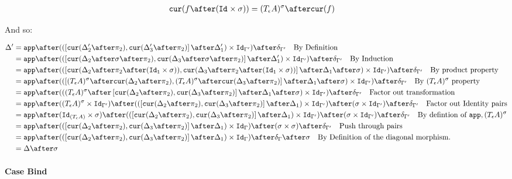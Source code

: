 {    \begin{align}
        \cur{f\after(\Id{}\times \si)} & = (\tea)^{\si} \after\cur{f}
    \end{align}

    And so:

    \begin{align}
        \D' & =\app\after((\fld{\cur{\D_2'\after\pp}}{\cur{\D_3'\after\pp}}\after\D_1')\times \Id{\G'})\after\diag{\G'}\qt{By Definition}\\
        & =\app\after((\fld{\cur{\D_2\after\si\after\pp}}{\cur{\D_3\after\si\after\pp}}\after\D_1')\times \Id{\G'})\after\diag{\G'}\qt{By Induction}\\
        & = \app\after((\fld{\cur{\D_2\after\pp\after(\Id{\1}\times \si)}}{\cur{\D_3\after\pp\after(\Id{\1}\times \si)}}\after\D_1\after\si)\times \Id{\G'})\after\diag{\G'}\qt{By product property}\\
        & = \app\after((\fld{(\tea)^{\si}\after\cur{\D_2\after\pp}}{(\tea)^{\si}\after\cur{\D_3\after\pp}}\after\D_1\after\si)\times \Id{\G'})\after\diag{\G'}\qt{By $(\tea)^{\si}$ property}\\
        & = \app\after(((\tea)^{\si}\after\fld{\cur{\D_2\after\pp}}{\cur{\D_3\after\pp}}\after\D_1\after\si)\times \Id{\G'})\after\diag{\G'}\qt{Factor out transformation}\\
        & = \app\after((\tea)^{\si}\times\Id{\G'})\after((\fld{\cur{\D_2\after\pp}}{\cur{\D_3\after\pp}}\after\D_1)\times \Id{\G'})\after(\si \times \Id{\G'})\after\diag{\G'}\qt{Factor out Identity pairs}\\
        & = \app\after(\Id{(\tea)}\times\si)\after((\fld{\cur{\D_2\after\pp}}{\cur{\D_3\after\pp}}\after\D_1) \times \Id{\G'})\after(\si \times \Id{\G'})\after\diag{\G'}\qt{By defintion of $\app, (\tea)^{\si}$}\\
        & = \app\after((\fld{\cur{\D_2\after\pp}}{\cur{\D_3\after\pp}}\after\D_1)\times \idg)\after(\si \times \si)\after\diag{\G'}\qt{Push through pairs}\\
        & = \app\after((\fld{\cur{\D_2\after\pp}}{\cur{\D_3\after\pp}}\after\D_1)\times \idg)\after\diag{\G}\after\si\qt{By Definition of the diagonal morphism.}\\
        & = \D\after\si
    \end{align}
    

    \paragraph{Case Bind}

}
